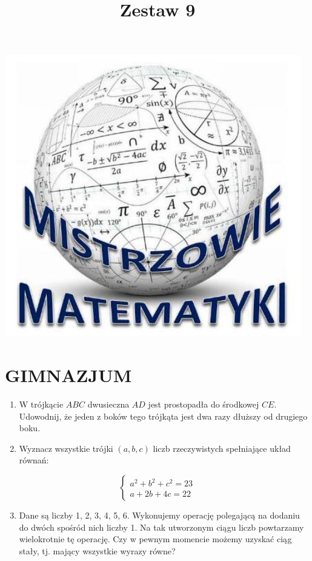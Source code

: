 \documentclass[10pt]{article}
\title{Zestaw 9 }
\author{}
\date{}
\begin{document}
\maketitle
\begin{center}
\includegraphics[max width=\textwidth]{2024_11_21_e893b38a73a71ebfc8f6g-1}
\end{center}

\section*{GIMNAZJUM}
\begin{enumerate}
  \item W trójkącie \(A B C\) dwusieczna \(A D\) jest prostopadła do środkowej \(C E\). Udowodnij, że jeden z boków tego trójkąta jest dwa razy dłuższy od drugiego boku.
  \item Wyznacz wszystkie trójki \((a, b, c)\) liczb rzeczywistych spełniające układ równań:
\end{enumerate}

\[
\left\{\begin{array}{c}
a^{2}+b^{2}+c^{2}=23 \\
a+2 b+4 c=22
\end{array}\right.
\]

\begin{enumerate}
  \setcounter{enumi}{2}
  \item Dane są liczby 1, 2, 3, 4, 5, 6. Wykonujemy operację polegającą na dodaniu do dwóch spośród nich liczby 1. Na tak utworzonym ciągu liczb powtarzamy wielokrotnie tę operację. Czy w pewnym momencie możemy uzyskać ciąg stały, tj. mający wszystkie wyrazy równe?
\end{enumerate}
\end{document}

